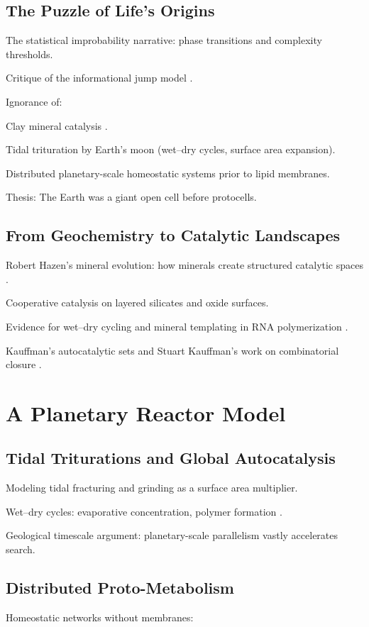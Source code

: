 \documentclass{book}
\begin{document}
\chapter{The Puzzle of Life’s Origins}
The statistical improbability narrative: phase transitions and complexity thresholds.

Critique of the informational jump model \citep{endres2025}.

Ignorance of:

Clay mineral catalysis \citep{hazen2005}.

Tidal trituration by Earth’s moon (wet–dry cycles, surface area expansion).

Distributed planetary-scale homeostatic systems prior to lipid membranes.

Thesis: The Earth was a giant open cell before protocells.

\chapter{From Geochemistry to Catalytic Landscapes}
Robert Hazen’s mineral evolution: how minerals create structured catalytic spaces \citep{hazen2008}.

Cooperative catalysis on layered silicates and oxide surfaces.

Evidence for wet–dry cycling and mineral templating in RNA polymerization \citep{robertson2012}.

Kauffman’s autocatalytic sets and Stuart Kauffman’s work on combinatorial closure \citep{kauffman1993}.

\part{A Planetary Reactor Model}

\chapter{Tidal Triturations and Global Autocatalysis}
Modeling tidal fracturing and grinding as a surface area multiplier.

Wet–dry cycles: evaporative concentration, polymer formation \citep{toppozada2021}.

Geological timescale argument: planetary-scale parallelism vastly accelerates search.

\chapter{Distributed Proto-Metabolism}
Homeostatic networks without membranes:
\end{document}

